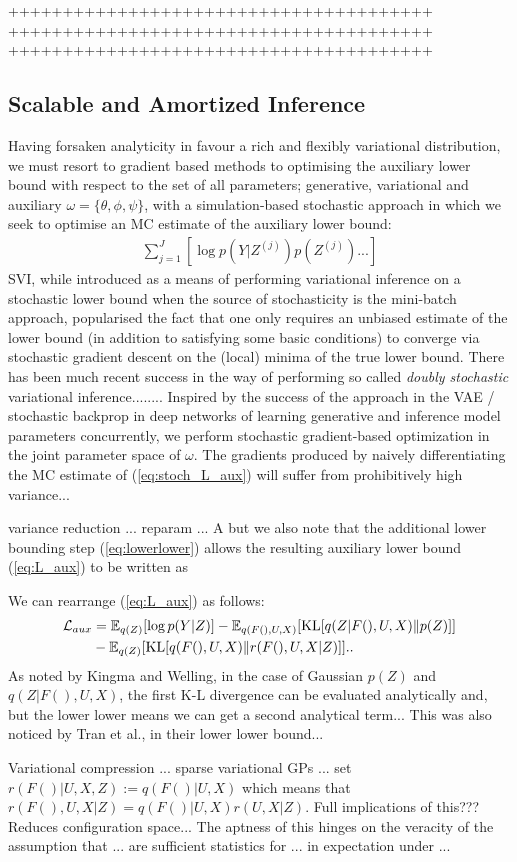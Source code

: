 \documentclass{article}
\begin{document}
+++++++++++++++++++++++++++++++++++++++
+++++++++++++++++++++++++++++++++++++++
+++++++++++++++++++++++++++++++++++++++

\subsection{Scalable and Amortized Inference}
\label{subsec:scale}

Having forsaken analyticity in favour a rich and flexibly variational distribution, we must resort to gradient based methods to optimising the auxiliary lower bound with respect to the set of all parameters; generative, variational and auxiliary $\omega=\{\theta,\phi,\psi\}$, with a simulation-based stochastic approach in which we seek to optimise an MC estimate of the auxiliary lower bound:
%
\begin{align}
  \sum_{j=1}^J [\log p(Y|Z^{(j)})p(Z^{(j)})...]\label{eq:stoch_L_aux}
\end{align}
%
SVI, while introduced as a means of performing variational inference on a stochastic lower bound when the source of stochasticity is the mini-batch approach, popularised the fact that one only requires an unbiased estimate of the lower bound (in addition to satisfying some basic conditions) to converge via stochastic gradient descent on the (local) minima of the true lower bound. There has been much recent success in the way of performing so called \emph{doubly stochastic} variational inference........
Inspired by the success of the approach in the VAE / stochastic backprop in deep networks of learning generative and inference model parameters concurrently, we perform stochastic gradient-based optimization in the joint parameter space of $\omega$. The gradients produced by naively differentiating the MC estimate of (\ref{eq:stoch_L_aux}) will suffer from prohibitively high variance...

variance reduction ... reparam ... A but we also note that the additional lower bounding step (\ref{eq:lowerlower}) allows the resulting auxiliary lower bound (\ref{eq:L_aux}) to be written as

We can rearrange (\ref{eq:L_aux}) as follows:
%
\begin{align}
  \mathcal{L}_{aux} &= \mathbb{E}_{q(Z)}[ \log p(Y|Z) ] - \mathbb{E}_{q(F(),U,X)}[ \text{KL}[q(Z|F(),U,X)\Vert p(Z)] ]\notag\\
  &- \mathbb{E}_{q(Z)}[ \text{KL}[q(F(),U,X)\Vert r(F(),U,X|Z)] ].\label{eq:L_aux_ABC}.
\end{align}
%
As noted by Kingma and Welling, in the case of Gaussian $p(Z)$ and $q(Z|F(),U,X)$, the first K-L divergence can be evaluated analytically and, but the lower lower means we can get a second analytical term... This was also noticed by Tran et al., in their lower lower bound...


Variational compression ... sparse variational GPs ... set $r(F()|U,X,Z):=q(F()|U,X)$ which means that $r(F(),U,X|Z) = q(F()|U,X)r(U,X|Z)$. Full implications of this??? Reduces configuration space... The aptness of this hinges on the veracity of the assumption that ... are sufficient statistics for ... in expectation under ...
\end{document}

